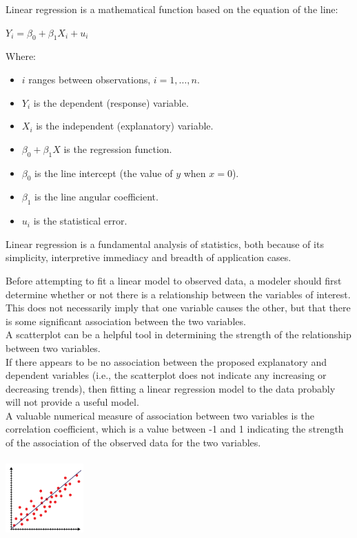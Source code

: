 \documentclass{article}
\begin{document}
Linear regression is a mathematical function based on the equation of the line:

$\displaystyle {Y_{i}=\beta _{0}+\beta _{1}X_{i}+u_{i}}$

Where:\\
\begin{itemize}
    \item $\displaystyle i$ ranges between observations, $\displaystyle i=1,\ldots,n.$
    \item $\displaystyle Y_{i}$ is the dependent (response) variable.
    \item $\displaystyle X_i$ is the independent (explanatory) variable.
    \item $\displaystyle \beta _{0}+\beta _{1}X$ is the regression function.
    \item $\displaystyle \beta _{0}$ is the line intercept (the value of $y$ when $x = 0$).
    \item $\displaystyle \beta _{1}$ is the line angular coefficient.
    \item $\displaystyle u_{i}$ is the statistical error.
\end{itemize}

Linear regression is a fundamental analysis of statistics, both because of its simplicity, interpretive immediacy and breadth of application cases.

Before attempting to fit a linear model to observed data, a modeler should first determine whether or not there is a relationship between the variables of interest. This does not necessarily imply that one variable causes the other, but that there is some significant association between the two variables. \\
A scatterplot can be a helpful tool in determining the strength of the relationship between two variables. \\
If there appears to be no association between the proposed explanatory and dependent variables (i.e., the scatterplot does not indicate any increasing or decreasing trends), then fitting a linear regression model to the data probably will not provide a useful model. \\ 
A valuable numerical measure of association between two variables is the correlation coefficient, which is a value between -1 and 1 indicating the strength of the association of the observed data for the two variables.

\includegraphics[width=3cm, height=3cm]{regression_chart}
\end{document}

